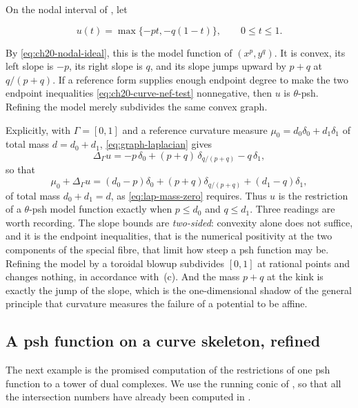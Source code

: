 \begin{example}
\label{ex:ch21-kink-example}
On the nodal interval of , let

\begin{equation}
\label{eq:ch21-kink}
                  u(t)=\max\{-pt,-q(1-t)\},
                  \qquad 0\leq t\leq1.
\end{equation}

By \eqref{eq:ch20-nodal-ideal}, this is the model function of
\((x^p,y^q)\).  It is convex, its left slope is \(-p\), its right slope is
\(q\), and its slope jumps upward by \(p+q\) at \(q/(p+q)\).  If a reference
form supplies enough endpoint degree to make the two endpoint inequalities
\eqref{eq:ch20-curve-nef-test} nonnegative, then \(u\) is
\(\theta\)-psh.  Refining the model merely subdivides the same convex graph.

Explicitly, with \(\Gamma=[0,1]\) and a reference curvature measure
\(\mu_0=d_0\delta_0+d_1\delta_1\) of total mass \(d=d_0+d_1\),
\eqref{eq:graph-laplacian} gives
\[
 \Delta_\Gamma u
 =-p\,\delta_0+(p+q)\,\delta_{q/(p+q)}-q\,\delta_1 ,
\]
so that
\[
 \mu_0+\Delta_\Gamma u
 =(d_0-p)\delta_0+(p+q)\delta_{q/(p+q)}+(d_1-q)\delta_1 ,
\]
of total mass \(d_0+d_1=d\), as \eqref{eq:lap-mass-zero} requires.  Thus
\(u\) is the restriction of a \(\theta\)-psh model function exactly when
\(p\leq d_0\) and \(q\leq d_1\).  Three readings are worth recording.  The
slope bounds are \emph{two-sided}: convexity alone does not suffice, and it
is the endpoint inequalities, that is the numerical positivity at the two
components of the special fibre, that limit how steep a psh function may be.
Refining the model by a toroidal blowup subdivides \([0,1]\) at rational
points and changes nothing, in accordance with
\,(c).  And the mass \(p+q\) at the kink is
exactly the jump of the slope, which is the one-dimensional shadow of the
general principle that curvature measures the failure of a potential to be
affine.
\end{example}

\subsection{A psh function on a curve skeleton, refined}
\label{sec:ch21-worked-conic}

The next example is the promised computation of the restrictions of one psh
function to a tower of dual complexes.  We use the running conic of
, so that all the intersection numbers have
already been computed in .

